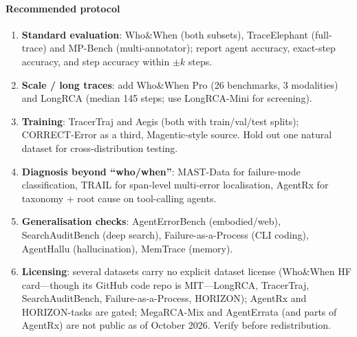 \paragraph{Recommended protocol}
\begin{enumerate}[leftmargin=1.2em]
\item \textbf{Standard evaluation}: Who\&When (both subsets), TraceElephant (full-trace) and MP-Bench (multi-annotator); report agent accuracy, exact-step accuracy, and step accuracy within $\pm k$ steps.
\item \textbf{Scale / long traces}: add Who\&When Pro (26 benchmarks, 3 modalities) and LongRCA (median 145 steps; use LongRCA-Mini for screening).
\item \textbf{Training}: TracerTraj and Aegis (both with train/val/test splits); CORRECT-Error as a third, Magentic-style source. Hold out one natural dataset for cross-distribution testing.
\item \textbf{Diagnosis beyond ``who/when''}: MAST-Data for failure-mode classification, TRAIL for span-level multi-error localisation, AgentRx for taxonomy + root cause on tool-calling agents.
\item \textbf{Generalisation checks}: AgentErrorBench (embodied/web), SearchAuditBench (deep search), Failure-as-a-Process (CLI coding), AgentHallu (hallucination), MemTrace (memory).
\item \textbf{Licensing}: several datasets carry no explicit dataset license (Who\&When HF card---though its GitHub code repo is MIT---LongRCA, TracerTraj, SearchAuditBench, Failure-as-a-Process, HORIZON); AgentRx and HORIZON-tasks are gated; MegaRCA-Mix and AgentErrata (and parts of AgentRx) are not public as of October 2026. Verify before redistribution.
\end{enumerate}
